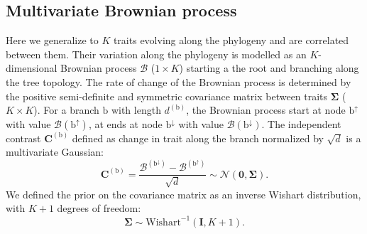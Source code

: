 \documentclass{article}
\newcommand{\UniDimArray}[1]{\bm{#1}}
\newcommand{\BiDimArray}[1]{\bm{#1}}
\newcommand{\branch}{\text{b}}
\newcommand{\branchexp}{^{(\branch)}}
\newcommand{\nodeUp}{\branch^{\uparrow}}
\newcommand{\nodeDown}{\branch^{\downarrow}}
\newcommand{\Ntrait}{K}
\newcommand{\contrast}{\UniDimArray{C}}
\newcommand{\Covariancematrix}{\Sigma}
\newcommand{\CovarianceMatrix}{\BiDimArray{\Covariancematrix}}
\newcommand{\Identitymatrix}{\BiDimArray{I}}
\newcommand{\brownian}{\mathcal{B}}
\newcommand{\Brownian}{\UniDimArray{\brownian}}
\newcommand{\vecZero}{\UniDimArray{0}}
\begin{document}
\subsection{Multivariate Brownian process}\label{subsec:multivariate-brownian-process}
Here we generalize to $\Ntrait$ traits evolving along the phylogeny and are correlated between them.
Their variation along the phylogeny is modelled as an $\Ntrait$-dimensional Brownian process $\Brownian$ ($1 \times \Ntrait$) starting a the root and branching along the tree topology.
The rate of change of the Brownian process is determined by the positive semi-definite and symmetric covariance matrix between traits $\CovarianceMatrix$ ($\Ntrait \times \Ntrait$).
For a branch $\branch$ with length $d\branchexp$, the Brownian process start at node $\nodeUp$ with value $\Brownian(\nodeUp)$, at ends at node $\nodeDown$ with value $\Brownian(\nodeDown)$.
The independent contrast $\contrast\branchexp$ defined as change in trait along the branch normalized by $\sqrt {d}$ is a multivariate Gaussian:
\begin{equation}
    \label{eq:DistribBrownian}
    \contrast\branchexp = \frac{\Brownian^{(\nodeDown)} - \Brownian^{(\nodeUp)} }{\sqrt {d}} \sim \mathcal{N}\left(\vecZero, \CovarianceMatrix \right).
\end{equation}
We defined the {prior} on the covariance matrix as an inverse Wishart distribution, with $\Ntrait + 1$ degrees of freedom:
\begin{equation}
    \label{eq:Distribcovariance}
    \CovarianceMatrix \sim \text{Wishart}^{-1} (\Identitymatrix, \Ntrait + 1).
\end{equation}
\end{document}
